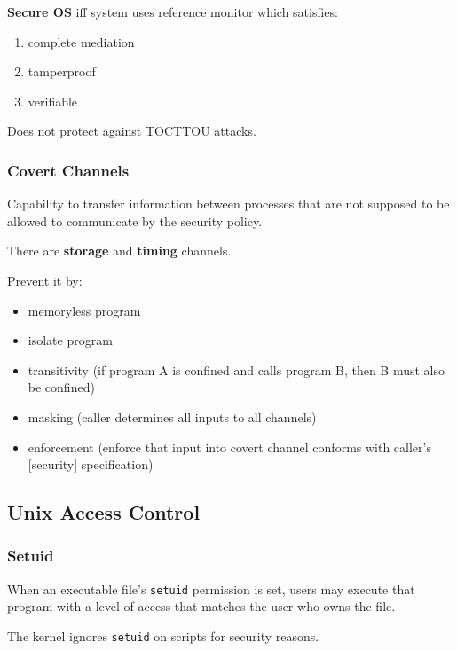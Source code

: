 \textbf{Secure OS} iff system uses reference monitor which satisfies:
\begin{enumerate}
    \item complete mediation
    \item tamperproof
    \item verifiable
\end{enumerate}

Does not protect against TOCTTOU attacks.

\subsubsection{Covert Channels}
Capability to transfer information between processes that are not supposed to be allowed to communicate by the security policy.

There are \textbf{storage} and \textbf{timing} channels.

Prevent it by:
\begin{itemize}
    \item memoryless program
    \item isolate program
    \item transitivity (if program A is confined and calls program B, then B must also be confined)
    \item masking (caller determines all inputs to all channels)
    \item enforcement (enforce that input into covert channel conforms with caller's [security] specification)
\end{itemize}

\subsection{Unix Access Control}
\subsubsection{Setuid}
When an executable file's \texttt{setuid} permission is set, users may execute that
program with a level of access that matches the user who owns the file.

The kernel ignores \texttt{setuid} on scripts for security reasons.
